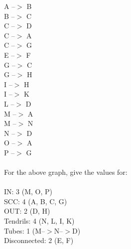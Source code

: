 \documentclass{article}
\begin{document}
		A --$>$ B\\
		B --$>$ C\\
		C --$>$ D\\
		C --$>$ A\\
		C --$>$ G\\
		E --$>$ F\\
		G --$>$ C\\
		G --$>$ H\\
		I --$>$ H\\
		I --$>$ K\\
		L --$>$ D\\
		M --$>$ A\\
		M --$>$ N\\
		N --$>$ D\\
		O --$>$ A\\
		P --$>$ G\\\\
		For the above graph, give the values for:\\\\
		IN: 3 (M, O, P)\\
		SCC: 4 (A, B, C, G)\\
		OUT: 2 (D, H)\\
		Tendrils: 4 (N, L, I, K)\\ 
		Tubes: 1 (M--$>$N--$>$D)\\
		Disconnected: 2 (E, F)\\
	
\end{document}

